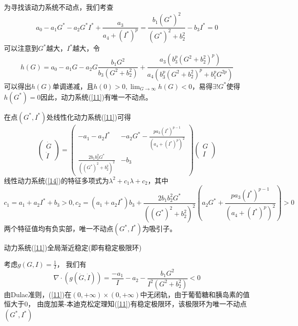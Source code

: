 \begin{pf}
    为寻找该动力系统不动点，我们考查
    \begin{equation}
        a_0-a_1G^*-a_2G^*I^*+\frac{a_3}{a_4+(I^*)^p}= \frac{b_1 (G^*)^2}{(G^*)^2 + b_2^2} - b_3 I^*=0
    \end{equation}
    可以注意到$G^*$越大，$I^*$越大，令
    \begin{equation}
        h(G)=a_0-a_1G-a_2G\frac{b_1G^2}{b_3(G^2+b_2^2)}+\frac{a_3(b_3^p(G^2+b_2^2)^p)}{a_4(b_3^p(G^2+b_2^2)^p+b_1^pG^{2p})}
    \end{equation}
    可以得出$h(G)$单调递减，且$h(0)>0,\lim_{G\to\infty}h(G)<0$，易得$\exists !G^*$使得$h(G^*)=0$因此，动力系统(\ref{11})有唯一不动点。

    在点$(G^*,I^*)$处线性化动力系统(\ref{11})可得
    \begin{equation}\label{14}
        \begin{pmatrix}
            \dot{G} \\
            \dot{I}
        \end{pmatrix}=\begin{pmatrix}
            -a_1-a_2I^*                              & -a_2G^*-\frac{pa_3(I^*)^{p-1}}{(a_4+(I^*)^p)^2} \\
            \frac{2b_1b_2^2G^*}{((G^*)^2 + b_2^2)^2} & -b_3
        \end{pmatrix}\begin{pmatrix}
            G \\
            I
        \end{pmatrix}
    \end{equation}
    线性动力系统(\ref{14})的特征多项式为$\lambda^2+c_1\lambda+c_2$，其中
    \begin{equation*}
        c_1=a_1+a_2I^*+b_3>0, c_2=(a_1+a_2I^*)b_3+\frac{2b_1b_2^2G^*}{((G^*)^2 + b_2^2)^2}(a_2G^*+\frac{pa_3(I^*)^{p-1}}{(a_4+(I^*)^p)^2})>0
    \end{equation*}
    两个特征值均有负实部，唯一不动点$(G^*,I^*)$为吸引子\cite{strogatz2018nonlinear}。

\end{pf}
\begin{prop}\label{prop2}
    动力系统(\ref{11})全局渐近稳定(即有稳定极限环)
\end{prop}
\begin{pf}
    考虑$g(G,I)=\frac{1}{I}$， 我们有
    \begin{equation}
        \nabla\cdot(g(\dot{G},\dot{I}))=\frac{-a_1}{I}-a_2-\frac{b_1 G^2}{I^2(G^2 + b_2^2)}<0
    \end{equation}
    由Dulac准则，(\ref{11})在$(0,+\infty)\times (0,+\infty)$中无闭轨，由于葡萄糖和胰岛素的值恒大于$0$， 由庞加莱-本迪克松定理知(\ref{11})有稳定极限环，该极限环为唯一不动点$(G^*,I^*)$
\end{pf}

